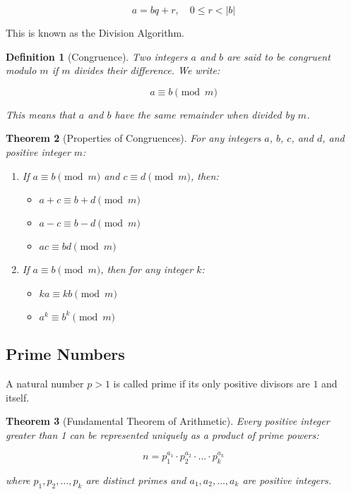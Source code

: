 \documentclass[12pt]{article}
\newif\ifDarkMode
\newcommand{\eqcolor}[1]{\ifDarkMode\textcolor{draculaPurple}{#1}\else#1\fi}
\newcommand{\numcolor}[1]{\ifDarkMode\textcolor{draculaOrange}{#1}\else#1\fi}
\newcommand{\varcolor}[1]{\ifDarkMode\textcolor{draculaGreen}{#1}\else#1\fi}
\newtheorem{theorem}{Theorem}[section]
\newtheorem{definition}[theorem]{Definition}
\begin{document}
\[
\eqcolor{a = bq + r}, \quad \numcolor{0} \leq \varcolor{r} < |\varcolor{b}|
\]

This is known as the Division Algorithm.

\begin{definition}[Congruence]
Two integers $\varcolor{a}$ and $\varcolor{b}$ are said to be congruent modulo $\varcolor{m}$ if $\varcolor{m}$ divides their difference. We write:

\[
\eqcolor{a \equiv b \pmod{m}}
\]

This means that $\varcolor{a}$ and $\varcolor{b}$ have the same remainder when divided by $\varcolor{m}$.
\end{definition}

\begin{theorem}[Properties of Congruences]
For any integers $\varcolor{a}$, $\varcolor{b}$, $\varcolor{c}$, and $\varcolor{d}$, and positive integer $\varcolor{m}$:
\begin{enumerate}
    \item If $\eqcolor{a \equiv b \pmod{m}}$ and $\eqcolor{c \equiv d \pmod{m}}$, then:
        \begin{itemize}
            \item $\eqcolor{a + c \equiv b + d \pmod{m}}$
            \item $\eqcolor{a - c \equiv b - d \pmod{m}}$
            \item $\eqcolor{ac \equiv bd \pmod{m}}$
        \end{itemize}
    \item If $\eqcolor{a \equiv b \pmod{m}}$, then for any integer $\varcolor{k}$:
        \begin{itemize}
            \item $\eqcolor{ka \equiv kb \pmod{m}}$
            \item $\eqcolor{a^k \equiv b^k \pmod{m}}$
        \end{itemize}
\end{enumerate}
\end{theorem}

\subsection{\textcolor{draculaYellow}{Prime Numbers}}

A natural number $\varcolor{p} > \numcolor{1}$ is called prime if its only positive divisors are $\numcolor{1}$ and itself.

\begin{theorem}[Fundamental Theorem of Arithmetic]
Every positive integer greater than 1 can be represented uniquely as a product of prime powers:

\[
\eqcolor{n = p_1^{a_1} \cdot p_2^{a_2} \cdot \ldots \cdot p_k^{a_k}}
\]

where $\varcolor{p_1}, \varcolor{p_2}, \ldots, \varcolor{p_k}$ are distinct primes and $\varcolor{a_1}, \varcolor{a_2}, \ldots, \varcolor{a_k}$ are positive integers.
\end{theorem}
\end{document}
